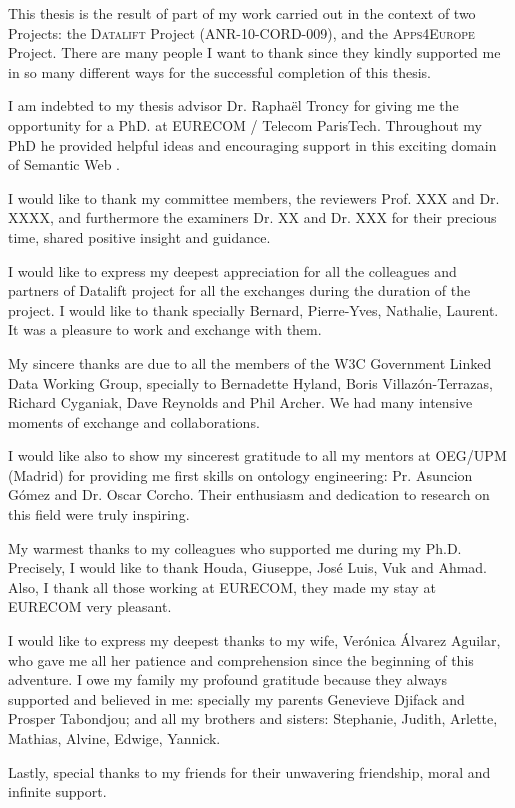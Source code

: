 
This thesis is the result of part of my work carried out in the context of two Projects: the \textsc{Datalift} Project (ANR-10-CORD-009), and the \textsc{Apps4Europe} Project. 
There are many people I want to thank since they kindly supported me in so many different ways for the successful completion of this thesis.


I am indebted to my thesis advisor Dr. Rapha\"{e}l Troncy for giving me the opportunity for a PhD. at EURECOM / Telecom ParisTech. Throughout my PhD  he provided helpful ideas and encouraging support in this exciting domain of Semantic Web . 

I would like to thank my committee members, the reviewers Prof. XXX  and Dr. XXXX, and furthermore the examiners Dr. XX and Dr. XXX for their precious time, shared positive insight and guidance.

I would like to express my deepest appreciation for all the colleagues and partners of Datalift project for all the exchanges during the duration of the project. I would like to thank specially Bernard, Pierre-Yves, Nathalie, Laurent. It was a pleasure to work and exchange with them.

My sincere thanks are due to all the members of the W3C Government Linked Data Working Group, specially to Bernadette Hyland, Boris Villaz\'{o}n-Terrazas, Richard Cyganiak, Dave Reynolds and Phil Archer. We had many intensive moments of exchange and collaborations.

I would like also to show my sincerest gratitude to all my mentors at OEG/UPM (Madrid) for providing me first skills on ontology engineering: Pr. Asuncion G\'{o}mez and Dr. Oscar Corcho. Their enthusiasm and dedication to research on this field were truly inspiring.


My warmest thanks to my colleagues who supported me during my Ph.D. Precisely, I would like to thank Houda, Giuseppe, Jos\'{e} Luis, Vuk and Ahmad. Also, I thank all those working at EURECOM, they made my stay at EURECOM very pleasant.

I would like to express my deepest thanks to my wife, Ver\'{o}nica \'{A}lvarez Aguilar, who gave me all her patience and comprehension since the beginning of this adventure. 
I owe my family my profound gratitude because they
always supported and believed in me: specially my parents Genevieve Djifack and Prosper Tabondjou; and all my brothers and sisters: Stephanie, Judith, Arlette, Mathias, Alvine, Edwige, Yannick.

Lastly, special thanks to my friends for their unwavering friendship, moral and infinite support.


 

